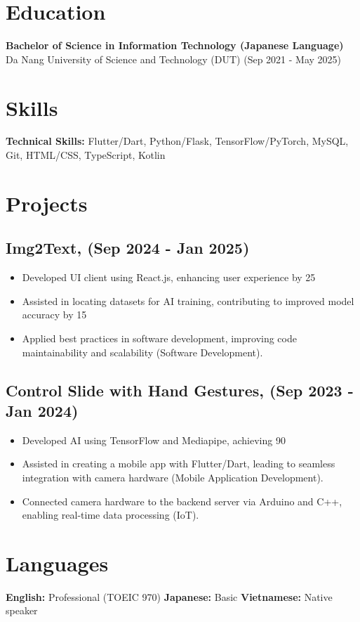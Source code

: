 \documentclass[a4paper,10pt]{article}
\begin{document}
\section*{Education}
\textbf{Bachelor of Science in Information Technology (Japanese Language)} \\ Da Nang University of Science and Technology (DUT) (Sep 2021 - May 2025)
\section*{Skills}
\textbf{Technical Skills:} Flutter/Dart, Python/Flask, TensorFlow/PyTorch, MySQL, Git, HTML/CSS, TypeScript, Kotlin
\section*{Projects}
\subsection*{Img2Text,  (Sep 2024 - Jan 2025)}
\begin{itemize}
    \item Developed UI client using React.js, enhancing user experience by 25%
    \item Assisted in locating datasets for AI training, contributing to improved model accuracy by 15%
    \item Applied best practices in software development, improving code maintainability and scalability (Software Development).
\end{itemize}
\subsection*{Control Slide with Hand Gestures,  (Sep 2023 - Jan 2024)}
\begin{itemize}
    \item Developed AI using TensorFlow and Mediapipe, achieving 90%
    \item Assisted in creating a mobile app with Flutter/Dart, leading to seamless integration with camera hardware (Mobile Application Development).
    \item Connected camera hardware to the backend server via Arduino and C++, enabling real-time data processing (IoT).
\end{itemize}
\section*{Languages}
\textbf{English:} Professional (TOEIC 970)
\textbf{Japanese:} Basic
\textbf{Vietnamese:} Native speaker
\end{document}
